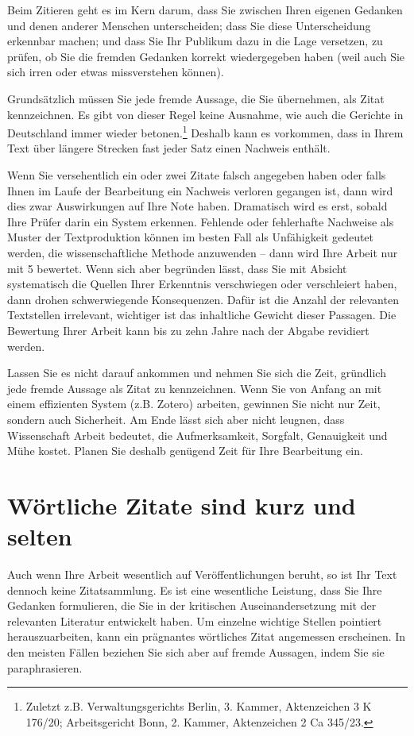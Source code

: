 Beim Zitieren geht es im Kern darum, dass Sie zwischen Ihren eigenen Gedanken und denen anderer Menschen unterscheiden; dass Sie diese Unterscheidung erkennbar machen; und dass Sie Ihr Publikum dazu in die Lage versetzen, zu prüfen, ob Sie die fremden Gedanken korrekt wiedergegeben haben (weil auch Sie sich irren oder etwas missverstehen können).

Grundsätzlich müssen Sie jede fremde Aussage, die Sie übernehmen, als Zitat kennzeichnen. Es gibt von dieser Regel keine Ausnahme, wie auch die Gerichte in Deutschland immer wieder betonen.\footnote{Zuletzt z.B. Verwaltungsgerichts Berlin, 3. Kammer, Aktenzeichen 3 K 176/20; Arbeitsgericht Bonn, 2. Kammer, Aktenzeichen 2 Ca 345/23.} Deshalb kann es vorkommen, dass in Ihrem Text über längere Strecken fast jeder Satz einen Nachweis enthält.

Wenn Sie versehentlich ein oder zwei Zitate falsch angegeben haben oder falls Ihnen im Laufe der Bearbeitung ein Nachweis verloren gegangen ist, dann wird dies zwar Auswirkungen auf Ihre Note haben. Dramatisch wird es erst, sobald Ihre Prüfer darin ein System erkennen. Fehlende oder fehlerhafte Nachweise als Muster der Textproduktion können im besten Fall als Unfähigkeit gedeutet werden, die wissenschaftliche Methode anzuwenden – dann wird Ihre Arbeit \glqq nur\grqq{} mit 5 bewertet. Wenn sich aber begründen lässt, dass Sie mit Absicht systematisch die Quellen Ihrer Erkenntnis verschwiegen oder verschleiert haben, dann drohen schwerwiegende Konsequenzen. Dafür ist die Anzahl der relevanten Textstellen irrelevant, wichtiger ist das inhaltliche Gewicht dieser Passagen. Die Bewertung Ihrer Arbeit kann bis zu zehn Jahre nach der Abgabe revidiert werden.

Lassen Sie es nicht darauf ankommen und nehmen Sie sich die Zeit, gründlich jede fremde Aussage als Zitat zu kennzeichnen. Wenn Sie von Anfang an mit einem effizienten System (z.B. Zotero) arbeiten, gewinnen Sie nicht nur Zeit, sondern auch Sicherheit. Am Ende lässt sich aber nicht leugnen, dass Wissenschaft Arbeit bedeutet, die Aufmerksamkeit, Sorgfalt, Genauigkeit und Mühe kostet. Planen Sie deshalb genügend Zeit für Ihre Bearbeitung ein.

\section{Wörtliche Zitate sind kurz und selten}
\label{sec:woertliche-zitate}

Auch wenn Ihre Arbeit wesentlich auf Veröffentlichungen beruht, so ist Ihr Text dennoch keine Zitatsammlung. Es ist eine wesentliche Leistung, dass Sie Ihre Gedanken formulieren, die Sie in der kritischen Auseinandersetzung mit der relevanten Literatur entwickelt haben. Um einzelne wichtige Stellen pointiert herauszuarbeiten, kann ein prägnantes wörtliches Zitat angemessen erscheinen. In den meisten Fällen beziehen Sie sich aber auf fremde Aussagen, indem Sie sie paraphrasieren.

